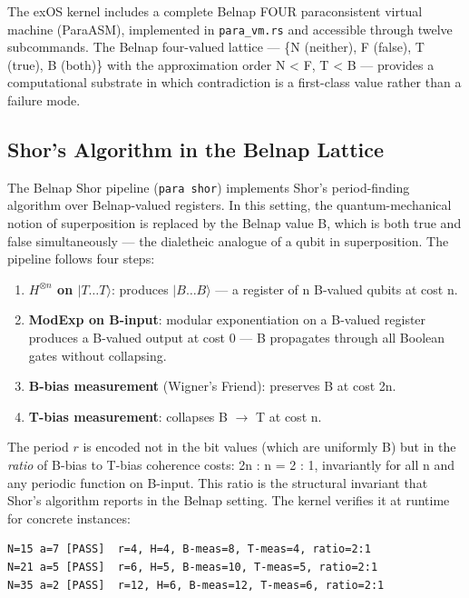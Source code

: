\documentclass[12pt,a4paper]{article}
\begin{document}
The exOS kernel includes a complete Belnap FOUR paraconsistent virtual machine (ParaASM), implemented in \texttt{para\_vm.rs} and accessible through twelve subcommands. The Belnap four-valued lattice --- \{N (neither), F (false), T (true), B (both)\} with the approximation order N \textless{} F, T \textless{} B --- provides a computational substrate in which contradiction is a first-class value rather than a failure mode.

\subsection{Shor's Algorithm in the Belnap Lattice}

The Belnap Shor pipeline (\texttt{para shor}) implements Shor's period-finding algorithm over Belnap-valued registers. In this setting, the quantum-mechanical notion of superposition is replaced by the Belnap value B, which is both true and false simultaneously --- the dialetheic analogue of a qubit in superposition. The pipeline follows four steps:

\begin{enumerate}
    \item \textbf{$H^{\otimes n}$ on $|T \ldots T\rangle$}: produces $|B \ldots B\rangle$ --- a register of n B-valued qubits at cost n.
    \item \textbf{ModExp on B-input}: modular exponentiation on a B-valued register produces a B-valued output at cost 0 --- B propagates through all Boolean gates without collapsing.
    \item \textbf{B-bias measurement} (Wigner's Friend): preserves B at cost 2n.
    \item \textbf{T-bias measurement}: collapses B $\rightarrow$ T at cost n.
\end{enumerate}

The period $r$ is encoded not in the bit values (which are uniformly B) but in the \emph{ratio} of B-bias to T-bias coherence costs: 2n : n = 2 : 1, invariantly for all n and any periodic function on B-input. This ratio is the structural invariant that Shor's algorithm reports in the Belnap setting. The kernel verifies it at runtime for concrete instances:

\begin{lstlisting}
N=15 a=7 [PASS]  r=4, H=4, B-meas=8, T-meas=4, ratio=2:1
N=21 a=5 [PASS]  r=6, H=5, B-meas=10, T-meas=5, ratio=2:1
N=35 a=2 [PASS]  r=12, H=6, B-meas=12, T-meas=6, ratio=2:1
\end{lstlisting}
\end{document}
